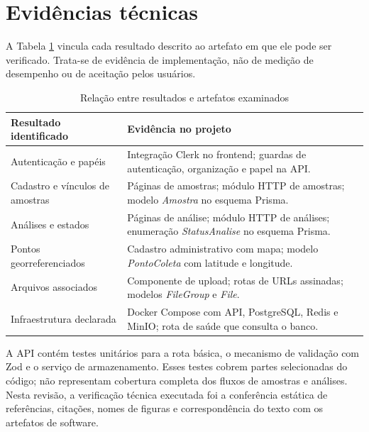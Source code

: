 
\section{Evidências técnicas}
\label{sec:evidencias}

A Tabela \ref{tab:evidencias} vincula cada resultado descrito ao artefato em que ele pode ser verificado. Trata-se de evidência de implementação, não de medição de desempenho ou de aceitação pelos usuários.

\begin{table}[htbp]
\centering
\caption{Relação entre resultados e artefatos examinados}
\label{tab:evidencias}
\small
\begin{tabular}{|p{4.0cm}|p{9.1cm}|}
\hline
\textbf{Resultado identificado} & \textbf{Evidência no projeto} \\ \hline
Autenticação e papéis & Integração Clerk no frontend; guardas de autenticação, organização e papel na API. \\ \hline
Cadastro e vínculos de amostras & Páginas de amostras; módulo HTTP de amostras; modelo \textit{Amostra} no esquema Prisma. \\ \hline
Análises e estados & Páginas de análise; módulo HTTP de análises; enumeração \textit{StatusAnalise} no esquema Prisma. \\ \hline
Pontos georreferenciados & Cadastro administrativo com mapa; modelo \textit{PontoColeta} com latitude e longitude. \\ \hline
Arquivos associados & Componente de upload; rotas de URLs assinadas; modelos \textit{FileGroup} e \textit{File}. \\ \hline
Infraestrutura declarada & Docker Compose com API, PostgreSQL, Redis e MinIO; rota de saúde que consulta o banco. \\ \hline
\end{tabular}
\end{table}

A API contém testes unitários para a rota básica, o mecanismo de validação com Zod e o serviço de armazenamento. Esses testes cobrem partes selecionadas do código; não representam cobertura completa dos fluxos de amostras e análises. Nesta revisão, a verificação técnica executada foi a conferência estática de referências, citações, nomes de figuras e correspondência do texto com os artefatos de software.

